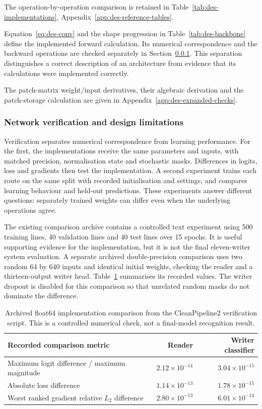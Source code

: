 The operation-by-operation comparison is retained in Table~\ref{tab:des-implementations}, Appendix~\ref{app:des-reference-tables}.


Equation~\ref{eq:des-conv} and the shape progression in Table~\ref{tab:des-backbone} define the implemented forward calculation. Its numerical correspondence and the backward operations are checked separately in Section~\ref{sec:des-netverify}. This separation distinguishes a correct description of an architecture from evidence that its calculations were implemented correctly.

The patch-matrix weight/input derivatives, their algebraic derivation and the patch-storage calculation are given in Appendix~\ref{app:des-expanded-checks}.

\subsubsection{Network verification and design limitations}
\label{sec:des-netverify}
Verification separates numerical correspondence from learning performance. For the first, the implementations receive the same parameters and inputs, with matched precision, normalisation state and stochastic masks. Differences in logits, loss and gradients then test the implementation. A second experiment trains each route on the same split with recorded initialisation and settings, and compares learning behaviour and held-out predictions. These experiments answer different questions: separately trained weights can differ even when the underlying operations agree.


The existing comparison archive contains a controlled text experiment using 500 training lines, 40 validation lines and 40 test lines over 15 epochs. It is useful supporting evidence for the implementation, but it is not the final eleven-writer system evaluation. A separate archived double-precision comparison uses two random 64 by 640 inputs and identical initial weights, checking the reader and a thirteen-output writer head. Table~\ref{tab:des-numericalcheck} summarises its recorded values. The writer dropout is disabled for this comparison so that unrelated random masks do not dominate the difference.


\begin{table}[H]\centering\small
\begin{tabularx}{\linewidth}{|X|r|r|}
\hline\textbf{Recorded comparison metric}&\textbf{Reader}&\textbf{Writer classifier}\\\hline
Maximum logit difference / maximum magnitude&$2.12\times10^{-14}$&$3.04\times10^{-15}$\\\hline
Absolute loss difference&$1.14\times10^{-13}$&$1.78\times10^{-15}$\\\hline
Worst ranked gradient relative $L_2$ difference&$2.80\times10^{-13}$&$6.01\times10^{-14}$\\\hline
\end{tabularx}
\caption{Archived float64 implementation comparison from the CleanPipeline2 verification script. This is a controlled numerical check, not a final-model recognition result.}
\label{tab:des-numericalcheck}
\end{table}

